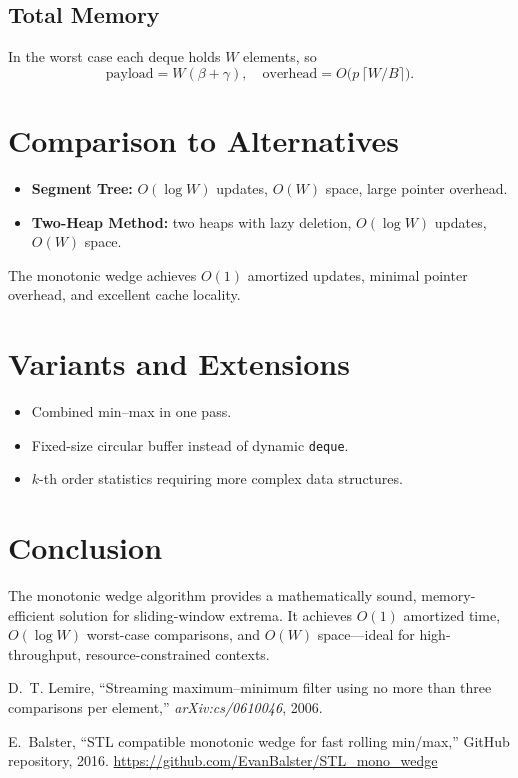 \documentclass[12pt,letterpaper]{article}
\begin{document}
\subsection{Total Memory}
In the worst case each deque holds \(W\) elements, so
\[
\text{payload} = W(\beta+\gamma), 
\quad
\text{overhead} = O\bigl(p\,\lceil W/B\rceil\bigr).
\]

\section{Comparison to Alternatives}
\begin{itemize}
  \item \textbf{Segment Tree:} \(O(\log W)\) updates, \(O(W)\) space, large pointer overhead.
  \item \textbf{Two-Heap Method:} two heaps with lazy deletion, \(O(\log W)\) updates, \(O(W)\) space.
\end{itemize}
The monotonic wedge achieves \(O(1)\) amortized updates, minimal pointer overhead, and excellent cache locality.

\section{Variants and Extensions}
\begin{itemize}
  \item Combined min–max in one pass.
  \item Fixed-size circular buffer instead of dynamic \texttt{deque}.
  \item \(k\)-th order statistics requiring more complex data structures.
\end{itemize}

\section{Conclusion}
The monotonic wedge algorithm provides a mathematically sound, memory-efficient solution for sliding-window extrema. It achieves \(O(1)\) amortized time, \(O(\log W)\) worst-case comparisons, and \(O(W)\) space—ideal for high-throughput, resource-constrained contexts.

\begin{thebibliography}{9}
D.~T. Lemire, “Streaming maximum–minimum filter using no more than three comparisons per element,” \emph{arXiv:cs/0610046}, 2006.

E.~Balster, “STL compatible monotonic wedge for fast rolling min/max,” GitHub repository, 2016.
\url{https://github.com/EvanBalster/STL_mono_wedge}
\end{thebibliography}
\end{document}
